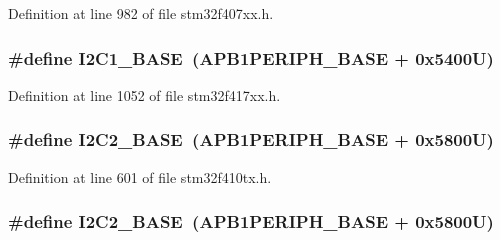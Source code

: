 Definition at line 982 of file stm32f407xx.\+h.

\subsubsection[{\texorpdfstring{I2\+C1\+\_\+\+B\+A\+SE}{I2C1_BASE}}]{\setlength{\rightskip}{0pt plus 5cm}\#define I2\+C1\+\_\+\+B\+A\+SE~({\bf A\+P\+B1\+P\+E\+R\+I\+P\+H\+\_\+\+B\+A\+SE} + 0x5400\+U)}\hypertarget{group___peripheral__registers__structures_gacd72dbffb1738ca87c838545c4eb85a3}{}\label{group___peripheral__registers__structures_gacd72dbffb1738ca87c838545c4eb85a3}


Definition at line 1052 of file stm32f417xx.\+h.

\subsubsection[{\texorpdfstring{I2\+C2\+\_\+\+B\+A\+SE}{I2C2_BASE}}]{\setlength{\rightskip}{0pt plus 5cm}\#define I2\+C2\+\_\+\+B\+A\+SE~({\bf A\+P\+B1\+P\+E\+R\+I\+P\+H\+\_\+\+B\+A\+SE} + 0x5800\+U)}\hypertarget{group___peripheral__registers__structures_ga04bda70f25c795fb79f163b633ad4a5d}{}\label{group___peripheral__registers__structures_ga04bda70f25c795fb79f163b633ad4a5d}


Definition at line 601 of file stm32f410tx.\+h.

\subsubsection[{\texorpdfstring{I2\+C2\+\_\+\+B\+A\+SE}{I2C2_BASE}}]{\setlength{\rightskip}{0pt plus 5cm}\#define I2\+C2\+\_\+\+B\+A\+SE~({\bf A\+P\+B1\+P\+E\+R\+I\+P\+H\+\_\+\+B\+A\+SE} + 0x5800\+U)}\hypertarget{group___peripheral__registers__structures_ga04bda70f25c795fb79f163b633ad4a5d}{}\label{group___peripheral__registers__structures_ga04bda70f25c795fb79f163b633ad4a5d}


